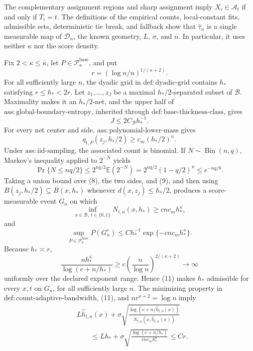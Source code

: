 The complementary assignment regions and sharp assignment imply \(X_i\in\mathcal A_t\) if and only if \(T_i=t\). The definitions of the empirical counts, local-constant fits, admissible sets, deterministic tie break, and fallback show that \(\widehat\tau_n\) is a single measurable map of \(\mathcal D_n\), the known geometry, \(L\), \(\sigma\), and \(n\). In particular, it uses neither \(\kappa\) nor the score density.

Fix \(2<\kappa\le\overline\kappa\), let \(P\in\mathcal P_{\kappa}^{\mathrm{base}}\), and put
\[
 r=(\log n/n)^{1/(\kappa+2)}.
\]
For all sufficiently large \(n\), the dyadic grid in \(\mathrm{def:dyadic\text{-}grid}\) contains \(h_*\) satisfying \(r\le h_*<2r\). Let \(z_1,\ldots,z_J\) be a maximal \(h_*/2\)-separated subset of \(\mathcal B\). Maximality makes it an \(h_*/2\)-net, and the upper half of \(\mathrm{ass:global\text{-}boundary\text{-}entropy}\), inherited through \(\mathrm{def:base\text{-}thickness\text{-}class}\), gives
\[
 J\le 2C_{\mathcal B}h_*^{-1}. \tag{8}
\]
For every net center and side, \(\mathrm{ass:polynomial\text{-}lower\text{-}mass}\) gives
\[
 q_{t,P}(z_j,h_*/2)\ge c_m(h_*/2)^\kappa. \tag{9}
\]
Under \(\mathrm{ass:iid\text{-}sampling}\), the associated count is binomial. If \(N\sim\operatorname{Bin}(n,q)\), Markov's inequality applied to \(2^{-N}\) yields
\[
 \Pr\{N\le nq/2\}
 \le 2^{nq/2}\mathbb E(2^{-N})
 =2^{nq/2}(1-q/2)^n
 \le e^{-nq/8}. \tag{10}
\]
Taking a union bound over (8), the two sides, and (9), and then using \(B(z_j,h_*/2)\subseteq B(x,h_*)\) whenever \(d(x,z_j)\le h_*/2\), produces a score-measurable event \(G_n\) on which
\[
 \inf_{x\in\mathcal B,\ t\in\{0,1\}}N_{t,n}(x,h_*)
 \ge c n c_mh_*^\kappa, \tag{11}
\]
and
\[
 \sup_{P\in\mathcal P_{\kappa}^{\mathrm{base}}}P(G_n^c)
 \le Ch_*^{-1}\exp\{-c n c_mh_*^\kappa\}. \tag{12}
\]
Because \(h_*\asymp r\),
\[
 \frac{nh_*^\kappa}{\log(e+n/h_*)}
 \ge c\left(\frac n{\log n}\right)^{2/(\overline\kappa+2)}\longrightarrow\infty \tag{13}
\]
uniformly over the declared exponent range. Hence (11) makes \(h_*\) admissible for every \(x,t\) on \(G_n\), for all sufficiently large \(n\). The minimizing property in \(\mathrm{def:count\text{-}adaptive\text{-}bandwidth}\), (11), and \(nr^{\kappa+2}=\log n\) imply
\[
 \begin{aligned}
 &L\widehat h_{t,n}(x)
 +\sigma\sqrt{\frac{\log(e+n/\widehat h_{t,n}(x))}
 {N_{t,n}(x,\widehat h_{t,n}(x))}}\\
 &\qquad\le Lh_*+
 \sigma\sqrt{\frac{\log(e+n/h_*)}{c n c_mh_*^\kappa}}
 \le Cr. \tag{14}
 \end{aligned}
\]

